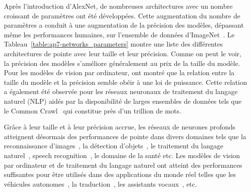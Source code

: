 Après l'introduction d'AlexNet, de nombreuses architectures avec un nombre croissant de paramètres ont été développées.
Cette augmentation du nombre de paramètres a conduit à une augmentation de la précision des modèles, dépassant même les performances humaines, sur l'ensemble de données d'ImageNet~\cite{he2015delving}.
Le Tableau~\ref{table:ap7-networks_parameters} montre une liste des différentes architectures de pointe avec leur taille et leur précision.
Comme on peut le voir, la précision des modèles s'améliore généralement au prix de la taille du modèle.
Pour les modèles de vision par ordinateur, \citet{tan2019efficientnet} ont montré que la relation entre la taille du modèle et la précision semble obéir à une loi de puissance.
Cette relation a également été observée pour les réseaux neuronaux de traitement du langage naturel (NLP) \cite{rosenfeld2020a,kaplan2020scaling} aidés par la disponibilité de larges ensembles de données tels que le Common Crawl~\cite{raffel2020exploring} qui constitue près d'un trillion de mots.


Grâce à leur taille et à leur précision accrue, les réseaux de neurones profonds atteignent désormais des performances de pointe dans divers domaines tels que la reconnaissance d'images~\cite{lecun1998gradient,krizhevsky2012imagenet,he2016deep,tan2019efficientnet}, la détection d'objets~\cite{redmon2016you, liu2016ssd,redmon2017yolo9000}, le traitement du langage naturel~\cite{merity2016pointer,vaswani2017attention,radford2019language,brown2020language}, speech recognition~\cite{hinton2012deep,abdel2014convolutional,yu2016automatic}, le domaine de la santé \cite{faust2018deep} etc.
Les modèles de vision par ordinateur et de traitement du langage naturel ont atteint des performances suffisantes pour être utilisés dans des applications du monde réel telles que les véhicules autonomes~\cite{fagnant2015preparing,sharma2021automating}, la traduction~\cite{wu2016google}, les assistants vocaux~\cite{li2017acoustic}, etc.




